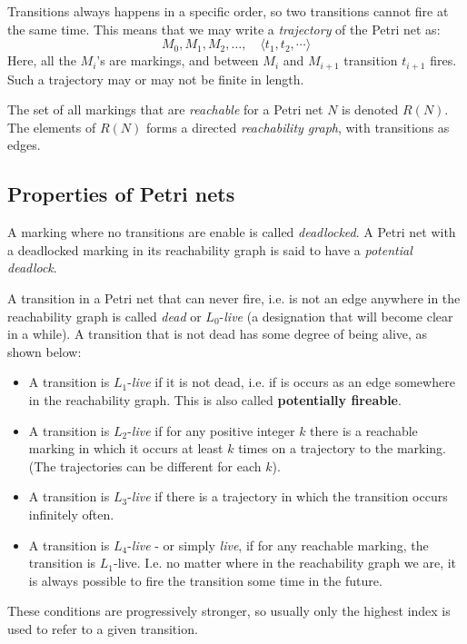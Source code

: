 \documentclass[12pt, a4paper]{article}
\numberwithin{equation}{section}
\begin{document}
Transitions always happens in a specific order, so two transitions cannot fire at the same time. This means that we may write a \textit{trajectory} of the Petri net as:
\begin{equation}
M_0, M_1, M_2, \ldots,\quad \langle t_1,t_2,\cdots\rangle
\end{equation}
Here, all the $M_i$'s are markings, and between $M_i$ and $M_{i+1}$ transition $t_{i+1}$ fires. Such a trajectory may or may not be finite in length.

The set of all markings that are \textit{reachable} for a Petri net $N$ is denoted $R(N)$. The elements of $R(N)$ forms a directed \textit{reachability graph}, with transitions as edges.

\subsection{Properties of Petri nets}
A marking where no transitions are enable is called \textit{deadlocked}. A Petri net with a deadlocked marking in its reachability graph is said to have a \textit{potential deadlock}.

A transition in a Petri net that can never fire, i.e. is not an edge anywhere in the reachability graph is called \textit{dead} or $L_0$-\textit{live} (a designation that will become clear in a while). A transition that is not dead has some degree of being alive, as shown below:
\begin{itemize}
\item A transition is $L_1$-\textit{live} if it is not dead, i.e. if is occurs as an edge somewhere in the reachability graph. This is also called \textbf{potentially fireable}.
\item  A transition is $L_2$-\textit{live} if for any positive integer $k$ there is a reachable marking in which it occurs at least $k$ times on a trajectory to the marking. (The trajectories can be different for each $k$).
\item  A transition is $L_3$-\textit{live} if there is a trajectory in which the transition occurs infinitely often.
\item  A transition is $L_4$-\textit{live} - or simply \textit{live}, if for any reachable marking, the transition is $L_1$-live. I.e. no matter where in the reachability graph we are, it is always possible to fire the transition some time in the future.
\end{itemize}
These conditions are progressively stronger, so usually only the highest index is used to refer to a given transition.
\end{document}
